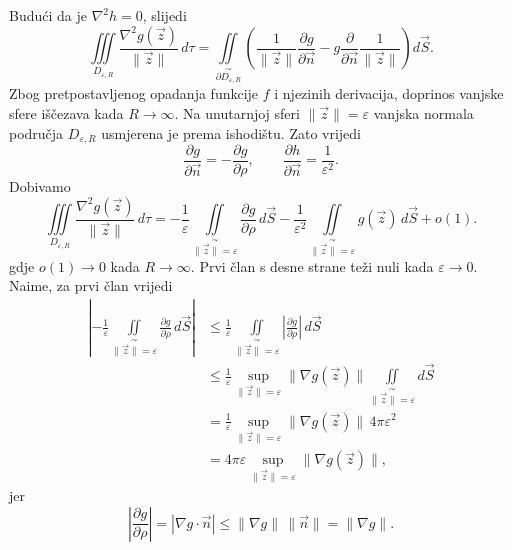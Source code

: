 \documentclass[12pt,a4paper]{article}
\makeatletter
\renewenvironment{proof}[1][\proofname]{\par
  \pushQED{\qed}%
  \normalfont
  \topsep6\p@\@plus6\p@\relax
  \trivlist
  \item[\hskip\labelsep
  \bfseries #1\@addpunct{.}]\ignorespaces
}{%
  \popQED\endtrivlist\@endpefalse
}
\makeatother
\begin{document}
\begin{proof}
Budući da je \(\nabla^2h=0\), slijedi
\[
\iiint\limits_{D_{\varepsilon,R}}
\frac{\nabla^2g(\overrightarrow{z})}
{\|\overrightarrow{z}\|}\,d\tau
=
\iint\limits_{\overset{\curvearrowright}{\partial D_{\varepsilon,R}}}
\left(
\frac{1}{\|\overrightarrow{z}\|}
\frac{\partial g}{\partial \overrightarrow{n}}
-
g\frac{\partial}{\partial \overrightarrow{n}}
\frac{1}{\|\overrightarrow{z}\|}
\right)d\overrightarrow{S}.
\]
Zbog pretpostavljenog opadanja funkcije \(f\) i njezinih derivacija, doprinos
vanjske sfere iščezava kada \(R\to\infty\). Na unutarnjoj sferi
\(\|\overrightarrow{z}\|=\varepsilon\) vanjska normala područja
\(D_{\varepsilon,R}\) usmjerena je prema ishodištu. Zato vrijedi
\[
\frac{\partial g}{\partial \overrightarrow{n}}
=
-\frac{\partial g}{\partial \rho},
\qquad
\frac{\partial h}{\partial \overrightarrow{n}}
=
\frac{1}{\varepsilon^2}.
\]
Dobivamo
\[
\iiint\limits_{D_{\varepsilon,R}}
\frac{\nabla^2g(\overrightarrow{z})}
{\|\overrightarrow{z}\|}\,d\tau
=
-\frac{1}{\varepsilon}
\iint\limits_{\overset{\curvearrowright}{\|\overrightarrow{z}\|=\varepsilon}}
\frac{\partial g}{\partial\rho}\,d\overrightarrow{S}
-
\frac{1}{\varepsilon^2}
\iint\limits_{\overset{\curvearrowright}{\|\overrightarrow{z}\|=\varepsilon}}
g(\overrightarrow{z})\,d\overrightarrow{S}
+o(1).
\]
gdje \(o(1)\to0\) kada \(R\to\infty\). Prvi član s desne strane teži nuli kada \(\varepsilon\to0\). Naime, za prvi član vrijedi
\[
\begin{aligned}
\left|
-\frac{1}{\varepsilon}
\iint\limits_{\overset{\curvearrowright}{\|\overrightarrow{z}\|=\varepsilon}}
\frac{\partial g}{\partial \rho}\,d\overrightarrow{S}
\right|
&\leq
\frac{1}{\varepsilon}
\iint\limits_{\overset{\curvearrowright}{\|\overrightarrow{z}\|=\varepsilon}}
\left|
\frac{\partial g}{\partial \rho}
\right|\,d\overrightarrow{S}
\\
&\leq
\frac{1}{\varepsilon}
\sup\limits_{\|\overrightarrow{z}\|=\varepsilon}
\|\nabla g(\overrightarrow{z})\|
\iint\limits_{\overset{\curvearrowright}{\|\overrightarrow{z}\|=\varepsilon}} d\overrightarrow{S}
\\
&=
\frac{1}{\varepsilon}
\sup\limits_{\|\overrightarrow{z}\|=\varepsilon}
\|\nabla g(\overrightarrow{z})\|
\,4\pi\varepsilon^2
\\
&=
4\pi\varepsilon
\sup\limits_{\|\overrightarrow{z}\|=\varepsilon}
\|\nabla g(\overrightarrow{z})\|,
\end{aligned}
\]
jer
\[
\left|
\frac{\partial g}{\partial \rho}
\right|
=
\left|
\nabla g\cdot\overrightarrow{n}
\right|
\leq
\|\nabla g\|\,\|\overrightarrow{n}\|
=
\|\nabla g\|.
\]


\end{proof}
\end{document}
